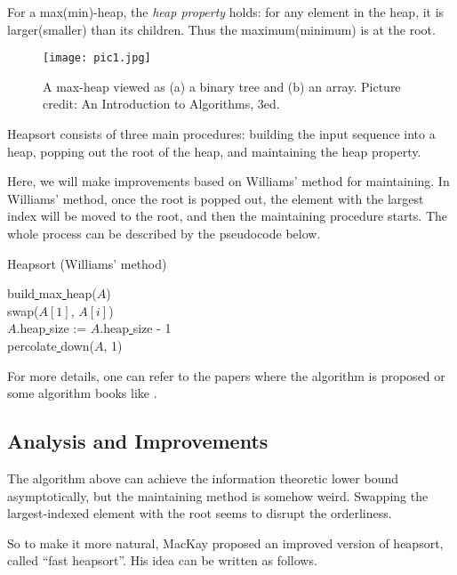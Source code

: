\documentclass[12pt]{extarticle}
\newcommand{\<}{\langle}
\renewcommand{\>}{\rangle}
\theoremstyle{definition}
\newcommand{\udl}{\underline{ }}
\begin{document}
For a max(min)-heap, the \textit{heap property} holds: for any element in the heap, it is larger(smaller) than its children. Thus the maximum(minimum) is at the root.

\begin{figure}[H]
	\centering
	\texttt{[image: pic1.jpg]}
	\caption{A max-heap viewed as (a) a binary tree and (b) an array. Picture credit: An Introduction to Algorithms, 3ed.}
	\label{plot1}
\end{figure}

Heapsort consists of three main procedures: building the input sequence into a heap, popping out the root of the heap, and maintaining the heap property. 

Here, we will make improvements based on Williams' method for maintaining. In Williams' method, once the root is popped out, the element with the largest index will be moved to the root, and then the maintaining procedure starts. The whole process can be described by the pseudocode below.

\begin{algorithm}[H]
	\caption{Heapsort (Williams' method)}
	\label{algo:heapsort_original}
	\LinesNumbered
	{\con build\udl max\udl heap($A$)} \\
		{
		{\con swap($A[1]$, $A[i]$)} \\
		{\con $A$.heap\udl size := $A$.heap\udl size - 1} \\
		{\con percolate\udl down($A$, 1)}
	}
\end{algorithm}

For more details, one can refer to the papers where the algorithm is proposed  or some algorithm books like \cite{cormen1990introduction}.

\subsection{Analysis and Improvements}

The algorithm above can achieve the information theoretic lower bound asymptotically, but the maintaining method is somehow weird. Swapping the largest-indexed element with the root seems to disrupt the orderliness. 

So to make it more natural, MacKay proposed an improved version of heapsort, called ``fast heapsort''. His idea can be written as follows.
\end{document}
